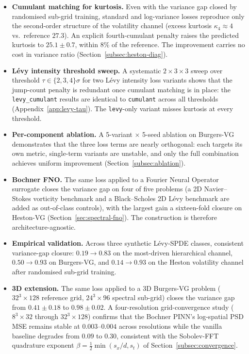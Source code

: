 \documentclass[review,12pt]{elsarticle}
\begin{document}
\begin{itemize}
\item \textbf{Cumulant matching for kurtosis.} Even with the variance
gap closed by randomised sub-grid training, standard and log-variance
losses reproduce only the second-order structure of the volatility
channel (excess kurtosis \(\kappa_4 \approx 4\) vs.\ reference
\(27.3\)). An explicit fourth-cumulant penalty raises the predicted
kurtosis to \(25.1 \pm 0.7\), within 8\% of the reference. The
improvement carries no cost in variance ratio
(Section~\ref{subsec:heston-diag}).

\item \textbf{L\'evy intensity threshold sweep.} A systematic
\(2\times3\times3\) sweep over threshold \(\tau \in \{2, 3, 4\}\sigma\)
for two L\'evy intensity loss variants shows that the jump-count
penalty is redundant once cumulant matching is in place: the
\texttt{levy\_cumulant} results are identical to \texttt{cumulant}
across all thresholds (Appendix~\ref{app:levy-tau}). The
\texttt{levy}-only variant misses kurtosis at every threshold.

\item \textbf{Per-component ablation.} A 5-variant \(\times\) 5-seed
ablation on Burgers-VG demonstrates that the three loss terms are
nearly orthogonal: each targets its own metric, single-term
variants are unstable, and only the full combination achieves
uniform improvement (Section~\ref{subsec:ablation}).

\item \textbf{Bochner FNO.} The same loss applied to a
Fourier Neural Operator surrogate closes the variance gap on four
of five problems (a 2D Navier--Stokes vorticity benchmark and a
Black--Scholes 2D L\'evy benchmark are added as out-of-class
controls), with the largest gain a sixteen-fold closure on
Heston-VG (Section~\ref{sec:spectral-fno}). The construction is
therefore architecture-agnostic.

\item \textbf{Empirical validation.} Across three synthetic L\'evy-SPDE
classes, consistent variance-gap closure: \(0.19 \to 0.83\) on the
most-driven hierarchical channel, \(0.50 \to 0.93\) on Burgers-VG,
and \(0.14 \to 0.93\) on the Heston volatility channel after
randomised sub-grid training.

\item \textbf{3D extension.} The same loss applied to a 3D Burgers-VG
problem (\(32^3 \times 128\) reference grid, \(24^3 \times 96\)
spectral sub-grid) closes the variance gap from \(0.41 \pm 0.18\) to
\(0.98 \pm 0.02\). A four-resolution grid-convergence study
(\(8^3 \times 32\) through \(32^3 \times 128\)) confirms that the
Bochner PINN's log-spatial PSD MSE remains stable at \(0.003\)--\(0.004\)
across resolutions while the vanilla baseline degrades from \(0.09\) to
\(0.30\), consistent with the Sobolev-FFT quadrature exponent
\(\beta = \tfrac12 \min(s_x/d, s_t)\) of Section~\ref{subsec:convergence}.


\end{itemize}
\end{document}
